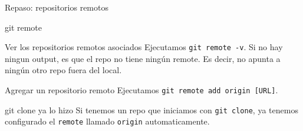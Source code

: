 \begin{frame}[t]{Repaso: repositorios remotos}
    \begin{comando}
        git remote
    \end{comando}

    \vspace{0.5em}
    \pause
    \begin{block}{Ver los repositorios remotos asociados}
        Ejecutamos \texttt{git remote -v}. Si no hay ningun output, es que el repo no tiene ningún remote. Es decir, no apunta a ningún otro repo fuera del local.
    \end{block}

    \pause
    \begin{block}{Agregar un repositorio remoto}
        Ejecutamos \texttt{git remote add origin [URL]}. %
    \end{block}

    \pause
    \begin{block}{git clone ya lo hizo}
        Si tenemos un repo que iniciamos con \texttt{git clone}, ya tenemos
        configurado el \texttt{remote} llamado \texttt{origin} automaticamente.
    \end{block}
\end{frame}


